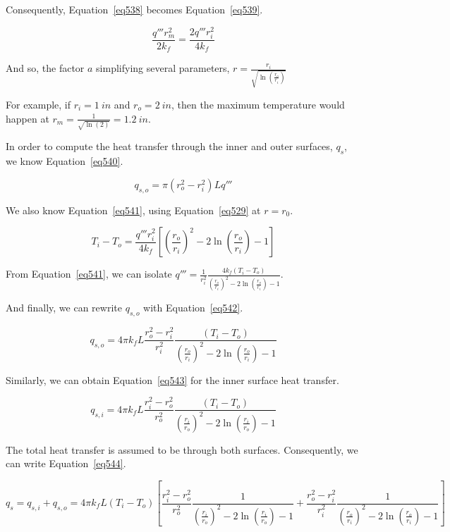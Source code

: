 Consequently, Equation~\ref{eq538} becomes Equation~\ref{eq539}.

\begin{equation}\label{eq539}
\frac{q'''r_m^2}{2k_f} = \frac{2q'''r_i^2}{4k_f}
\end{equation}

And so, the factor $a$ simplifying several parameters, $r = \frac{r_i}{\sqrt{\ln \left( \frac{r_o}{r_i} \right)}}$

For example, if $r_i = 1\ in$ and $r_o = 2\ in$, then the maximum temperature would happen at $r_m = \frac{1}{\sqrt{\ln(2)}} = 1.2\ in$.

In order to compute the heat transfer through the inner and outer surfaces, $q_s$, we know Equation~\ref{eq540}.

\begin{equation}\label{eq540}
q_{s,o} = \pi (r_o^2 - r_i^2)Lq'''
\end{equation}

We also know Equation~\ref{eq541}, using Equation~\ref{eq529} at $r=r_0$.

\begin{equation}\label{eq541}
T_i - T_o = \frac{q'''r_i^2}{4k_f}\left[ \left( \frac{r_o}{r_i} \right)^2 - 2\ln \left( \frac{r_o}{r_i} \right) - 1 \right]
\end{equation}

From Equation~\ref{eq541}, we can isolate $q''' = \frac{1}{r_i^2}\frac{4k_f(T_i - T_o)}{\left( \frac{r_o}{r_i} \right)^2 - 2\ln \left( \frac{r_o}{r_i} \right) - 1}$.

And finally, we can rewrite $q_{s,o}$ with Equation~\ref{eq542}.

\begin{equation}\label{eq542}
q_{s,o} = 4\pi k_f L \frac{r_o^2 - r_i^2}{r_i^2}\frac{(T_i - T_o)}{\left( \frac{r_o}{r_i} \right)^2 - 2\ln \left( \frac{r_o}{r_i} \right) - 1}
\end{equation}

Similarly, we can obtain Equation~\ref{eq543} for the inner surface heat transfer.


\begin{equation}\label{eq543}
q_{s,i} = 4\pi k_f L \frac{r_i^2 - r_o^2}{r_o^2}\frac{(T_i - T_o)}{\left( \frac{r_i}{r_o} \right)^2 - 2\ln \left( \frac{r_i}{r_o} \right) - 1}
\end{equation}

The total heat transfer is assumed to be through both surfaces. Consequently, we can write Equation~\ref{eq544}.

\begin{equation}\label{eq544}
q_s = q_{s,i} + q_{s,o} = 4\pi k_f L (T_i - T_o) \left[ \frac{r_i^2 - r_o^2}{r_o^2}\frac{1}{\left( \frac{r_i}{r_o} \right)^2 - 2\ln \left( \frac{r_i}{r_o} \right) - 1} + \frac{r_o^2 - r_i^2}{r_i^2}\frac{1}{\left( \frac{r_o}{r_i} \right)^2 - 2\ln \left( \frac{r_o}{r_i} \right) - 1} \right]
\end{equation}
